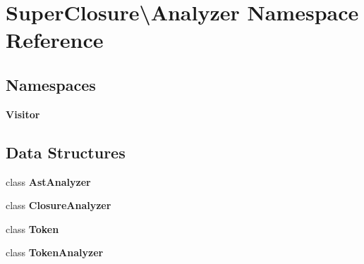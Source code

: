\section{Super\+Closure\textbackslash{}Analyzer Namespace Reference}
\label{namespace_super_closure_1_1_analyzer}
\subsection*{Namespaces}
\begin{DoxyCompactItemize}
\item 
 {\bf Visitor}
\end{DoxyCompactItemize}
\subsection*{Data Structures}
\begin{DoxyCompactItemize}
\item 
class {\bf Ast\+Analyzer}
\item 
class {\bf Closure\+Analyzer}
\item 
class {\bf Token}
\item 
class {\bf Token\+Analyzer}
\end{DoxyCompactItemize}
